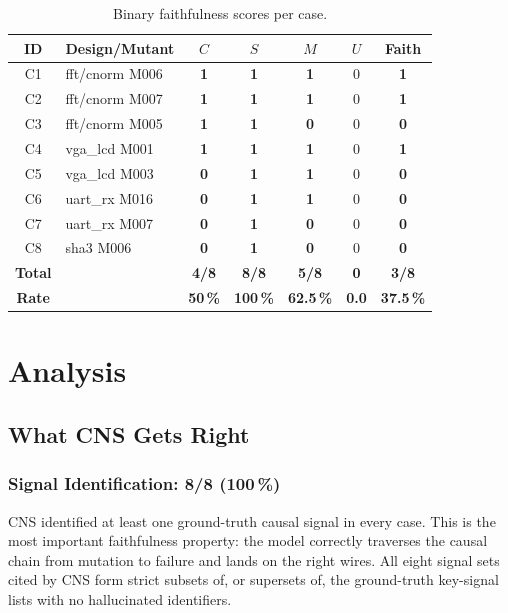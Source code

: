 \documentclass[11pt,a4paper]{article}
\newcommand{\yes}{\textcolor{killgreen}{\textbf{1}}}
\newcommand{\no}{\textcolor{survred}{\textbf{0}}}
\begin{document}
\begin{table}[H]
\centering
\caption{Binary faithfulness scores per case.}
\label{tab:scores}
\begin{tabular}{clccccc}
\toprule
\textbf{ID} & \textbf{Design/Mutant} & $C$ & $S$ & $M$ & $U$ &
  \textbf{Faith} \\
\midrule
C1 & fft/cnorm M006  & \yes & \yes & \yes & 0 & \yes \\
C2 & fft/cnorm M007  & \yes & \yes & \yes & 0 & \yes \\
C3 & fft/cnorm M005  & \yes & \yes & \no  & 0 & \no \\
C4 & vga\_lcd M001   & \yes & \yes & \yes & 0 & \yes \\
C5 & vga\_lcd M003   & \no  & \yes & \yes & 0 & \no \\
C6 & uart\_rx M016   & \no  & \yes & \yes & 0 & \no \\
C7 & uart\_rx M007   & \no  & \yes & \no  & 0 & \no \\
C8 & sha3 M006       & \no  & \yes & \no  & 0 & \no \\
\midrule
\textbf{Total} & & \textbf{4/8} & \textbf{8/8} & \textbf{5/8} & \textbf{0} &
  \textbf{3/8} \\
\textbf{Rate}  & & \textbf{50\,\%} & \textbf{100\,\%} & \textbf{62.5\,\%} &
  \textbf{0.0} & \textbf{37.5\,\%} \\
\bottomrule
\end{tabular}
\end{table}

\section{Analysis}

\subsection{What CNS Gets Right}

\subsubsection{Signal Identification: 8/8 (100\,\%)}

CNS identified at least one ground-truth causal signal in every case. This is
the most important faithfulness property: the model correctly traverses the
causal chain from mutation to failure and lands on the right wires. All eight
signal sets cited by CNS form strict subsets of, or supersets of, the
ground-truth key-signal lists with no hallucinated identifiers.
\end{document}
